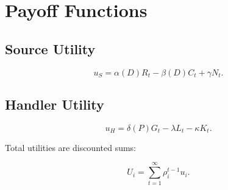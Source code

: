 \section{Payoff Functions}

\subsection{Source Utility}



\[
u_S = \alpha(D) R_t - \beta(D) C_t + \gamma N_t.
\]



\subsection{Handler Utility}



\[
u_H = \delta(P) G_t - \lambda L_t - \kappa K_t.
\]



Total utilities are discounted sums:


\[
U_i = \sum_{t=1}^{\infty} \rho_i^{t-1} u_i.
\]


